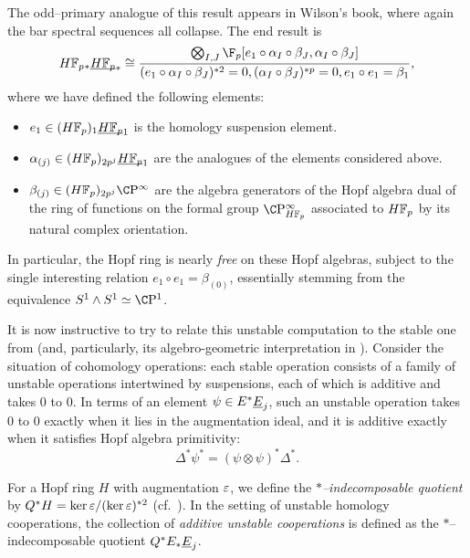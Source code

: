 \begin{remark}
The odd--primary analogue of this result appears in Wilson's book, where again the bar spectral sequences all collapse.  The end result is \[\HFp_* \OS{\HFp}{*} \cong \frac{\bigotimes_{I, J} \F_p[e_1 \circ \alpha_I \circ \beta_J, \alpha_I \circ \beta_J]}{(e_1 \circ \alpha_I \circ \beta_J)^{\ast 2} = 0, (\alpha_I \circ \beta_J)^{\ast p} = 0, e_1 \circ e_1 = \beta_1},\] where we have defined the following elements:
\begin{itemize}
\item \(e_1 \in (\HFp)_1 \OS{\HFp}{1}\) is the homology suspension element.
\item \(\alpha_{(j)} \in (\HFp)_{2p^j} \OS{\HFp}{1}\) are the analogues of the elements considered above.
\item \(\beta_{(j)} \in (\HFp)_{2p^j} \CP^\infty\) are the algebra generators of the Hopf algebra dual of the ring of functions on the formal group \(\CP^\infty_{\HFp}\) associated to \(\HFp\) by its natural complex orientation.
\end{itemize}
In particular, the Hopf ring is nearly \emph{free} on these Hopf algebras, subject to the single interesting relation \(e_1 \circ e_1 = \beta_{(0)}\), essentially stemming from the equivalence \(S^1 \sm S^1 \simeq \CP^1\).
\end{remark}

It is now instructive to try to relate this unstable computation to the stable one from  (and, particularly, its algebro-geometric interpretation in ).  Consider the situation of cohomology operations: each stable operation consists of a family of unstable operations intertwined by suspensions, each of which is additive and takes \(0\) to \(0\).  In terms of an element \(\psi \in E^* \underline{\smash{E}}_{j}\), such an unstable operation takes \(0\) to \(0\) exactly when it lies in the augmentation ideal, and it is additive exactly when it satisfies Hopf algebra primitivity: \[\Delta^* \psi^* = (\psi \otimes \psi)^* \Delta^*.\]
\begin{definition}
For a Hopf ring \(H\) with augmentation \(\varepsilon\), we define the \textit{\(\ast\)--indecomposable quotient} by \(Q^* H = \ker \varepsilon / (\ker \varepsilon)^{\ast 2}\) (cf.\ ).  In the setting of unstable homology cooperations, the collection of \textit{additive unstable cooperations} is defined as the \(\ast\)--indecomposable quotient \(Q^* E_* \underline{\smash{E}}_{j}\).
\end{definition}

